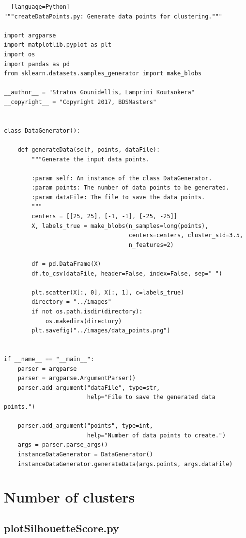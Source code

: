 \documentclass[11pt]{article}
\begin{document}
\begin{lstlisting}  [language=Python]
"""createDataPoints.py: Generate data points for clustering."""

import argparse
import matplotlib.pyplot as plt
import os
import pandas as pd
from sklearn.datasets.samples_generator import make_blobs

__author__ = "Stratos Gounidellis, Lamprini Koutsokera"
__copyright__ = "Copyright 2017, BDSMasters"


class DataGenerator():

    def generateData(self, points, dataFile):
        """Generate the input data points.

        :param self: An instance of the class DataGenerator.
        :param points: The number of data points to be generated.
        :param dataFile: The file to save the data points.
        """
        centers = [[25, 25], [-1, -1], [-25, -25]]
        X, labels_true = make_blobs(n_samples=long(points),
                                    centers=centers, cluster_std=3.5,
                                    n_features=2)

        df = pd.DataFrame(X)
        df.to_csv(dataFile, header=False, index=False, sep=" ")

        plt.scatter(X[:, 0], X[:, 1], c=labels_true)
        directory = "../images"
        if not os.path.isdir(directory):
            os.makedirs(directory)
        plt.savefig("../images/data_points.png")


if __name__ == "__main__":
    parser = argparse
    parser = argparse.ArgumentParser()
    parser.add_argument("dataFile", type=str,
                        help="File to save the generated data points.")

    parser.add_argument("points", type=int,
                        help="Number of data points to create.")
    args = parser.parse_args()
    instanceDataGenerator = DataGenerator()
    instanceDataGenerator.generateData(args.points, args.dataFile)

\end{lstlisting}

    

\section{Number of clusters}\label{number-of-clusters}

\subsection{plotSilhouetteScore.py }\label{plotsilhouettescore.py}
\end{document}
